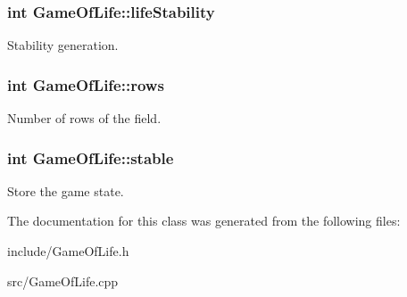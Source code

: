 \subsubsection[{life\+Stability}]{\setlength{\rightskip}{0pt plus 5cm}int Game\+Of\+Life\+::life\+Stability\hspace{0.3cm}{\ttfamily [private]}}\hypertarget{classGameOfLife_a0a05708cd58b7eadfd96d84a3641b835}{}\label{classGameOfLife_a0a05708cd58b7eadfd96d84a3641b835}
Stability generation. 
\subsubsection[{rows}]{\setlength{\rightskip}{0pt plus 5cm}int Game\+Of\+Life\+::rows\hspace{0.3cm}{\ttfamily [private]}}\hypertarget{classGameOfLife_a37d5c145e0ffc0b957988e8d5a0c910b}{}\label{classGameOfLife_a37d5c145e0ffc0b957988e8d5a0c910b}
Number of rows of the field. 
\subsubsection[{stable}]{\setlength{\rightskip}{0pt plus 5cm}int Game\+Of\+Life\+::stable\hspace{0.3cm}{\ttfamily [private]}}\hypertarget{classGameOfLife_a59c0b43f3d368465d9473622fa8059f3}{}\label{classGameOfLife_a59c0b43f3d368465d9473622fa8059f3}
Store the game state. 

The documentation for this class was generated from the following files\+:\begin{DoxyCompactItemize}
\item 
include/Game\+Of\+Life.\+h\item 
src/Game\+Of\+Life.\+cpp\end{DoxyCompactItemize}
